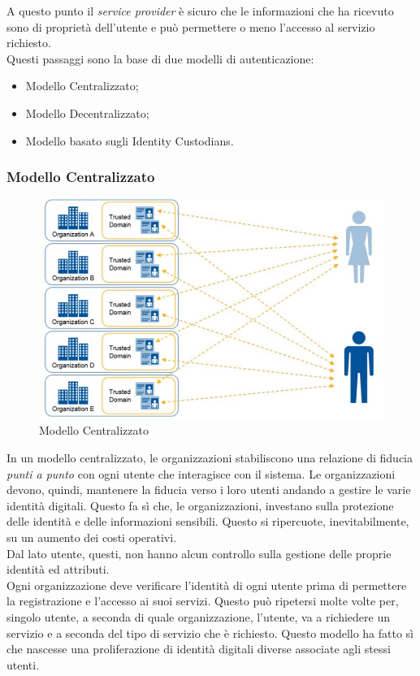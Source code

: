 A questo punto il \textit{service provider} è sicuro che le informazioni che ha ricevuto sono di proprietà dell'utente e può permettere o meno l'accesso al servizio richiesto.\\
Questi passaggi sono la base di due modelli di autenticazione:
\begin{itemize}
	\item Modello Centralizzato;
	\item Modello Decentralizzato;
	\item Modello basato sugli Identity Custodians.
\end{itemize}

\subsubsection{Modello Centralizzato}
\begin{figure}[!h]
	\centering
	\includegraphics[scale=0.5]{immagini/ITF_Centralizzato}
	\caption{Modello Centralizzato}
\end{figure}
In un modello centralizzato, le organizzazioni stabiliscono una relazione di fiducia \textit{punti a punto} con ogni utente che interagisce con il sistema.
Le organizzazioni devono, quindi, mantenere la fiducia verso i loro utenti andando a gestire le varie identità digitali. Questo fa sì che, le organizzazioni, investano sulla protezione delle identità e delle informazioni sensibili. Questo si ripercuote, inevitabilmente, su un aumento dei costi operativi.\\
Dal lato utente, questi, non hanno alcun controllo sulla gestione delle proprie identità ed attributi.\\
Ogni organizzazione deve verificare l'identità di ogni utente prima di permettere la registrazione e l'accesso ai suoi servizi. Questo può ripetersi molte volte per, singolo utente, a seconda di quale organizzazione, l'utente, va a richiedere un servizio e a seconda del tipo di servizio che è richiesto. 
Questo modello ha fatto sì che nascesse una proliferazione di identità digitali diverse associate agli stessi utenti\cite{ITF_gartner}.
